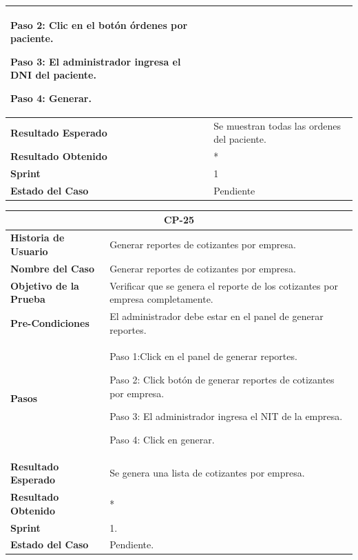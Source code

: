 \documentclass[12pt,a4paper]{article}
\begin{document}
\begin{center}
\begin{tabular}{|m{5cm}|m{9cm}|}
Paso 2: Clic en el botón órdenes por paciente.

Paso 3: El administrador ingresa el DNI del paciente.

Paso 4: Generar.
\\
\hline
\textbf{Resultado Esperado} & Se muestran todas las ordenes del paciente.\\
\hline
\textbf{Resultado Obtenido} & * \\
\hline
\textbf{Sprint} & 1 \\
\hline
\textbf{Estado del Caso} & Pendiente \\
\hline
\end{tabular}
\vspace{5mm}

\begin{tabular}{|m{5cm}|m{9cm}|}
\hline
\multicolumn{2}{|c|}{\textbf{CP-25}} \\
\hline
\textbf{Historia de Usuario} & Generar reportes de cotizantes por empresa. \\
\hline
\textbf{Nombre del Caso} & Generar reportes de cotizantes por empresa.\\
\hline
\textbf{Objetivo de la Prueba} & Verificar que se genera el reporte de los cotizantes por empresa completamente.  \\
\hline
\textbf{Pre-Condiciones} & El administrador debe estar en el panel de generar reportes. \\
\hline
\textbf{Pasos} & Paso 1:Click en el panel de generar reportes.

Paso 2: Click botón de generar reportes de cotizantes por empresa.

Paso 3: El administrador ingresa el NIT de la empresa.

Paso 4: Click en generar.
\\
\hline
\textbf{Resultado Esperado} & Se genera una lista de cotizantes por empresa.\\
\hline
\textbf{Resultado Obtenido} & * \\
\hline
\textbf{Sprint} & 1. \\
\hline
\textbf{Estado del Caso} & Pendiente. \\
\hline
\end{tabular}
\vspace{5mm}

\end{center}
\end{document}
